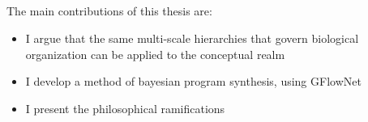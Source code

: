 


\subsection{}
The main contributions of this thesis are: 
\begin{itemize}
    \item I argue that the same multi-scale hierarchies that govern biological organization can be applied to the conceptual realm
    \item I develop a method of bayesian program synthesis, using GFlowNet
    \item I present the philosophical ramifications
\end{itemize}






